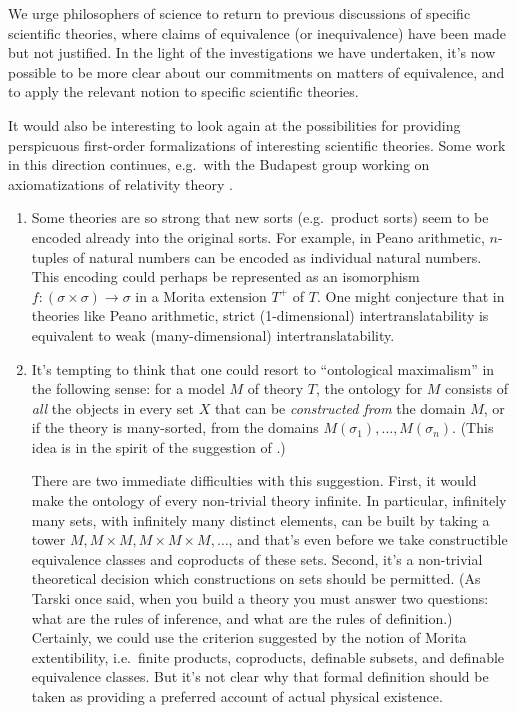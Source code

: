 We urge philosophers of science to return to previous discussions of
specific scientific theories, where claims of equivalence (or
inequivalence) have been made but not justified.  In the light of the
investigations we have undertaken, it's now possible to be more clear
about our commitments on matters of equivalence, and to apply the
relevant notion to specific scientific theories.

It would also be interesting to look again at the possibilities for
providing perspicuous first-order formalizations of interesting
scientific theories.  Some work in this direction continues, e.g.\
with the Budapest group working on axiomatizations of relativity
theory \cite[see][]{andreka2014}.

\begin{enumerate}
\item Some theories are so strong that new sorts (e.g.\ product sorts)
  seem to be encoded already into the original sorts.  For example, in
  Peano arithmetic, $n$-tuples of natural numbers can be encoded as
  individual natural numbers.  This encoding could perhaps be
  represented as an isomorphism $f:(\sigma \times \sigma )\to \sigma$
  in a Morita extension $T^+$ of $T$.  One might conjecture that in
  theories like Peano arithmetic, strict (1-dimensional)
  intertranslatability is equivalent to weak (many-dimensional)
  intertranslatability.

\item It's tempting to think that one could resort to ``ontological
  maximalism'' in the following sense: for a model $M$ of theory $T$,
  the ontology for $M$ consists of {\it all} the objects in every set
  $X$ that can be {\it constructed from} the domain $M$, or if the
  theory is many-sorted, from the domains
  $M(\sigma _1),\dots ,M(\sigma _n)$.  (This idea is in the spirit of
  the suggestion of \cite{hawmax}.)

  There are two immediate difficulties with this suggestion.  First,
  it would make the ontology of every non-trivial theory infinite.  In
  particular, infinitely many sets, with infinitely many distinct
  elements, can be built by taking a tower
  $M,M\times M,M\times M\times M,\dots $, and that's even before we
  take constructible equivalence classes and coproducts of these sets.
  Second, it's a non-trivial theoretical decision which constructions
  on sets should be permitted.  (As Tarski once said, when you build a
  theory you must answer two questions: what are the rules of
  inference, and what are the rules of definition.)  Certainly, we
  could use the criterion suggested by the notion of Morita
  extentibility, i.e.\ finite products, coproducts, definable subsets,
  and definable equivalence classes.  But it's not clear why that
  formal definition should be taken as providing a preferred account
  of actual physical existence.


\end{enumerate}
